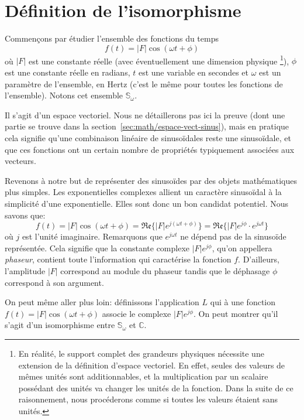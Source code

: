 \section{Définition de l'isomorphisme}
Commençons par étudier l'ensemble des fonctions du temps
\[
    f(t) = |F|\cos(\omega t + \phi)
\]
où $|F|$ est une constante réelle (avec éventuellement une dimension physique
\footnote{
    En réalité, le support complet des grandeurs physiques
    nécessite une extension de la définition d'espace vectoriel.
    En effet, seules des valeurs de mêmes unités sont additionnables,
    et la multiplication par un scalaire possédant des unités
    va changer les unités de la fonction.
    Dans la suite de ce raisonnement,
    nous procéderons comme si toutes les valeurs étaient sans unités.
}),
$\phi$ est une constante réelle en radians,
$t$ est une variable en secondes
et $\omega$ est un paramètre de l'ensemble, en Hertz
(c'est le même pour toutes les fonctions de l'ensemble).
Notons cet ensemble $\mathbb{S}_\omega$.

Il s'agit d'un espace vectoriel.
Nous ne détaillerons pas ici la preuve
(dont une partie se trouve dans la section~\ref{sec:math/espace-vect-sinus}),
mais en pratique cela signifie qu'une combinaison linéaire
de sinusoïdales reste une sinusoïdale,
et que ces fonctions ont un certain nombre de propriétés
typiquement associées aux vecteurs.

Revenons à notre but de représenter des sinusoïdes
par des objets mathématiques plus simples.
Les exponentielles complexes allient un caractère sinusoïdal à
la simplicité d'une exponentielle.
Elles sont donc un bon candidat potentiel.
Nous savons que:
\begin{equation}
    f(t) = |F|\cos(\omega t + \phi) = \mathfrak{Re}\{|F|e^{j(\omega t + \phi)}\}
    = \mathfrak{Re}\{|F|e^{j\phi}\cdot e^{j\omega t}\}
\end{equation}
où $j$ est l'unité imaginaire.
Remarquons que $e^{j\omega t}$ ne dépend pas de la sinusoïde représentée.
Cela signifie que la constante complexe $|F|e^{j\phi}$,
qu'on appellera \emph{phaseur}, contient
toute l'information qui caractérise la fonction $f$.
D'ailleurs, l'amplitude $|F|$ correspond au module du phaseur
tandis que le déphasage $\phi$ correspond à son argument.

On peut même aller plus loin: définissons l'application $L$
qui à une fonction $f(t) = |F|\cos(\omega t + \phi)$
associe le complexe $|F|e^{j\phi}$.
On peut montrer qu'il s'agit d'un
isomorphisme entre $\mathbb{S}_\omega$ et $\mathbb{C}$.

